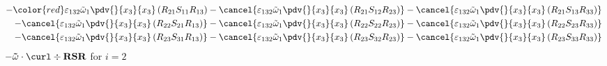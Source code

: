 \begin{equation}
\begin{split}
		-{\color{red}\varepsilon_{132}\tilde{\omega}_{1}\pdv{}{x_{3}}{x_{3}}\left(R_{21}S_{11}R_{13}\right)}
		-\cancel{\varepsilon_{132}\tilde{\omega}_{1}\pdv{}{x_{3}}{x_{3}}\left(R_{21}S_{12}R_{23}\right)}
		-\cancel{\varepsilon_{132}\tilde{\omega}_{1}\pdv{}{x_{3}}{x_{3}}\left(R_{21}S_{13}R_{33}\right)}\\
		-\cancel{\varepsilon_{132}\tilde{\omega}_{1}\pdv{}{x_{3}}{x_{3}}\left(R_{22}S_{21}R_{13}\right)}
		-\cancel{\varepsilon_{132}\tilde{\omega}_{1}\pdv{}{x_{3}}{x_{3}}\left(R_{22}S_{22}R_{23}\right)}
		-\cancel{\varepsilon_{132}\tilde{\omega}_{1}\pdv{}{x_{3}}{x_{3}}\left(R_{22}S_{23}R_{33}\right)}\\
		-\cancel{\varepsilon_{132}\tilde{\omega}_{1}\pdv{}{x_{3}}{x_{3}}\left(R_{23}S_{31}R_{13}\right)}
		-\cancel{\varepsilon_{132}\tilde{\omega}_{1}\pdv{}{x_{3}}{x_{3}}\left(R_{23}S_{32}R_{23}\right)}
		-\cancel{\varepsilon_{132}\tilde{\omega}_{1}\pdv{}{x_{3}}{x_{3}}\left(R_{23}S_{33}R_{33}\right)}\\
	\end{split}
\end{equation}
$-\mathbf{\tilde{\omega}}\cdot\curl \div \mathbf{RSR}$ for $i=2$
